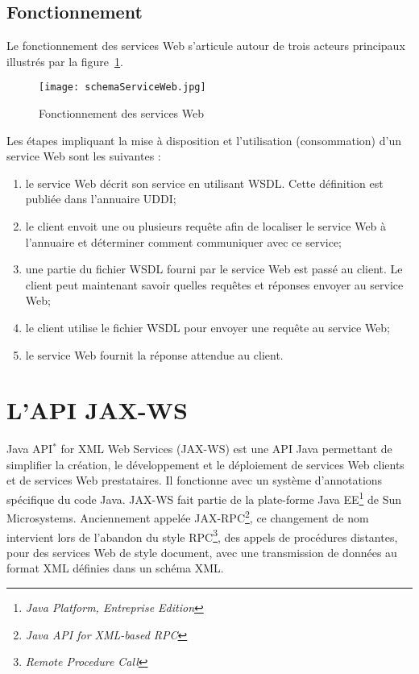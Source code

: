 \subsection{Fonctionnement}

Le fonctionnement des services Web s'articule autour de trois acteurs principaux illustr\'es par la figure~\ref{figure:schemaServiceWeb}.

\clearpage

\begin{figure}[!ht]
	\centering
	\texttt{[image: schemaServiceWeb.jpg]}
	\caption{Fonctionnement des services Web}
	\label{figure:schemaServiceWeb}

\end{figure}

Les \'etapes impliquant la mise \`a disposition et l'utilisation (consommation) d'un service Web sont les suivantes :

\begin{enumerate}
	\item le service Web d\'ecrit son service en utilisant WSDL. 
	Cette d\'efinition est publi\'ee dans l'annuaire UDDI;
	\item le client envoit une ou plusieurs requ\^ete afin de localiser le service Web \`a l'annuaire et d\'eterminer comment communiquer avec ce service;
	\item une partie du fichier WSDL fourni par le service Web est pass\'e au client. 
	Le client peut maintenant savoir quelles requ\^etes et r\'eponses envoyer au service Web;
	\item le client utilise le fichier WSDL pour envoyer une requ\^ete au service Web;
	\item le service Web fournit la r\'eponse attendue au client.

\end{enumerate}

\section{L'API JAX-WS}

Java API$^*$ for XML Web Services (JAX-WS) est une API Java permettant de simplifier la cr\'eation, le d\'eveloppement et le d\'eploiement de services Web clients et de services Web prestataires.
Il fonctionne avec un syst\`eme d'annotations sp\'ecifique du code Java.
JAX-WS fait partie de la plate-forme Java EE\protect\footnote{\textit{Java Platform, Entreprise Edition}} de Sun Microsystems.
Anciennement appel\'ee JAX-RPC\protect\footnote{\textit{Java API for XML-based RPC}}, ce changement de nom intervient lors de l'abandon du style RPC\protect\footnote{\textit{Remote Procedure Call}}, des appels de proc\'edures distantes, pour des services Web de style document, avec une transmission de donn\'ees au format XML d\'efinies dans un sch\'ema XML.

